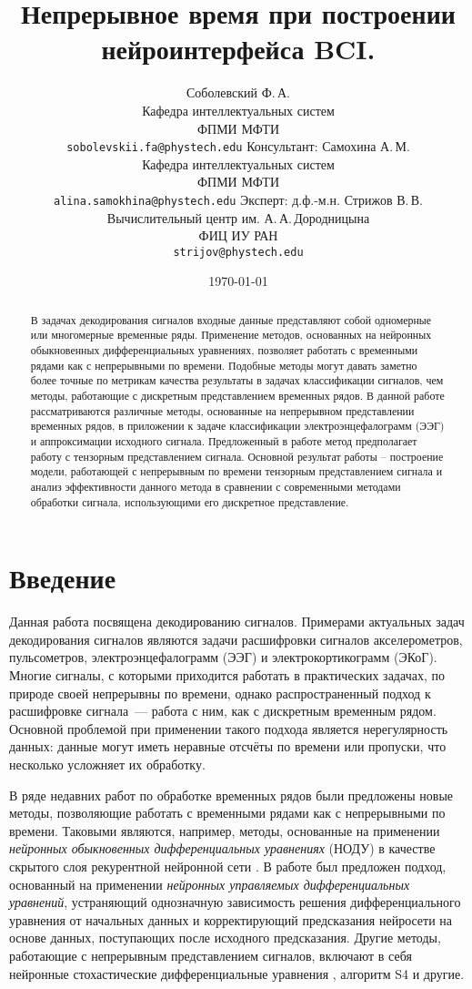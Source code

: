 \documentclass[a4paper, 12pt]{article} %
\title{Непрерывное время при построении нейроинтерфейса BCI.}
\author{ Соболевский Ф.\,А.\\
	Кафедра интеллектуальных систем \\
        ФПМИ МФТИ\\ 
	\texttt{sobolevskii.fa@phystech.edu} 
	\AND
        Консультант: Самохина А.\,М.\\
	Кафедра интеллектуальных систем \\
        ФПМИ МФТИ\\
	\texttt{alina.samokhina@phystech.edu} 
        \AND
        Эксперт: д.ф.-м.н. Стрижов В.\,В.\\
	Вычислительный центр им. А.\,А.\,Дородницына\\
        ФИЦ ИУ РАН \\
	\texttt{strijov@phystech.edu}
}
\date{\today}
\begin{document}
\maketitle


\begin{abstract}
В задачах декодирования сигналов входные данные представляют собой одномерные или многомерные временные ряды. Применение методов, основанных на нейронных обыкновенных дифференциальных уравнениях, позволяет работать с временными рядами как с непрерывными по времени. Подобные методы могут давать заметно более точные по метрикам качества результаты в задачах классификации сигналов, чем методы, работающие с дискретным представлением временных рядов. В данной работе рассматриваются различные методы, основанные на непрерывном представлении временных рядов, в приложении к задаче классификации электроэнцефалограмм (ЭЭГ) и аппроксимации исходного сигнала. Предложенный в работе метод предполагает работу с тензорным представлением сигнала. Основной результат работы – построение модели, работающей с непрерывным по времени тензорным представлением сигнала и анализ эффективности данного метода в сравнении с современными методами обработки сигнала, использующими его дискретное представление.
\end{abstract}




\section{Введение}
Данная работа посвящена декодированию сигналов. Примерами актуальных задач декодирования сигналов являются задачи расшифровки сигналов акселерометров, пульсометров, электроэнцефалограмм (ЭЭГ) и электрокортикограмм (ЭКоГ). Многие сигналы, с которыми приходится работать в практических задачах, по природе своей непрерывны по времени, однако распространенный подход к расшифровке сигнала~--- работа с ним, как с дискретным временным рядом. Основной проблемой при применении такого подхода является нерегулярность данных: данные могут иметь неравные отсчёты по времени или пропуски, что несколько усложняет их обработку.

В ряде недавних работ по обработке временных рядов были предложены новые методы, позволяющие работать с временными рядами как с непрерывными по времени. Таковыми являются, например, методы, основанные на применении \textit{нейронных обыкновенных дифференциальных уравнениях} (НОДУ) в качестве скрытого слоя рекурентной нейронной сети \cite{neural_ode}. В работе \cite{cde} был предложен подход, основанный на применении \textit{нейронных управляемых дифференциальных уравнений}, устраняющий однозначную зависимость решения дифференциального уравнения от начальных данных и корректирующий предсказания нейросети на основе данных, поступающих после исходного предсказания. Другие методы, работающие с непрерывным представлением сигналов, включают в себя нейронные стохастические дифференциальные уравнения \cite{neural_sde}, алгоритм S4 \cite{algo_s4} и другие.
\end{document}
